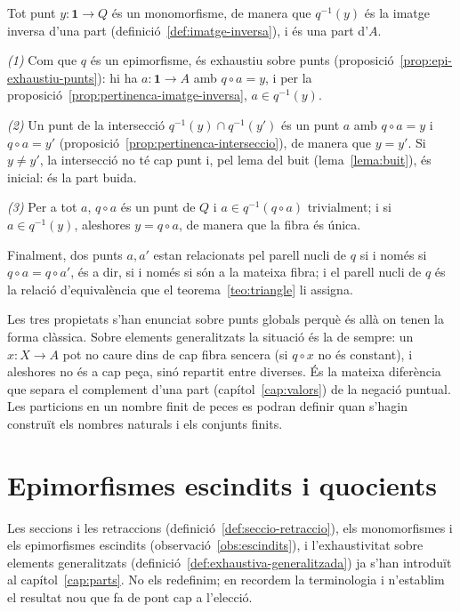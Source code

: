 \begin{prova}
Tot punt \(y\colon\mathbf1\to Q\) és un monomorfisme, de manera que \(q^{-1}(y)\) és la imatge inversa d'una part (definició~\ref{def:imatge-inversa}), i és una part d'\(A\).

\emph{(1)} Com que \(q\) és un epimorfisme, és exhaustiu sobre punts (proposició~\ref{prop:epi-exhaustiu-punts}): hi ha \(a\colon\mathbf1\to A\) amb \(q\circ a=y\), i per la proposició~\ref{prop:pertinenca-imatge-inversa}, \(a\in q^{-1}(y)\).

\emph{(2)} Un punt de la intersecció \(q^{-1}(y)\cap q^{-1}(y')\) és un punt \(a\) amb \(q\circ a=y\) i \(q\circ a=y'\) (proposició~\ref{prop:pertinenca-interseccio}), de manera que \(y=y'\). Si \(y\ne y'\), la intersecció no té cap punt i, pel lema del buit (lema~\ref{lema:buit}), és inicial: és la part buida.

\emph{(3)} Per a tot \(a\), \(q\circ a\) és un punt de \(Q\) i \(a\in q^{-1}(q\circ a)\) trivialment; i si \(a\in q^{-1}(y)\), aleshores \(y=q\circ a\), de manera que la fibra és única.

Finalment, dos punts \(a,a'\) estan relacionats pel parell nucli de \(q\) si i només si \(q\circ a=q\circ a'\), és a dir, si i només si són a la mateixa fibra; i el parell nucli de \(q\) és la relació d'equivalència que el teorema~\ref{teo:triangle} li assigna.
\end{prova}

\begin{observacio}\label{obs:particio-punts}
Les tres propietats s'han enunciat sobre punts globals perquè és allà on tenen la forma clàssica. Sobre elements generalitzats la situació és la de sempre: un \(x\colon X\to A\) pot no caure dins de cap fibra sencera (si \(q\circ x\) no és constant), i aleshores no és a cap peça, sinó repartit entre diverses. És la mateixa diferència que separa el complement d'una part (capítol~\ref{cap:valors}) de la negació puntual. Les particions en un nombre finit de peces es podran definir quan s'hagin construït els nombres naturals i els conjunts finits.
\end{observacio}

\section{Epimorfismes escindits i quocients}\label{sec:escindits-quocients}

Les seccions i les retraccions (definició~\ref{def:seccio-retraccio}), els monomorfismes i els epimorfismes escindits (observació~\ref{obs:escindits}), i l'exhaustivitat sobre elements generalitzats (definició~\ref{def:exhaustiva-generalitzada}) ja s'han introduït al capítol~\ref{cap:parts}. No els redefinim; en recordem la terminologia i n'establim el resultat nou que fa de pont cap a l'elecció.

